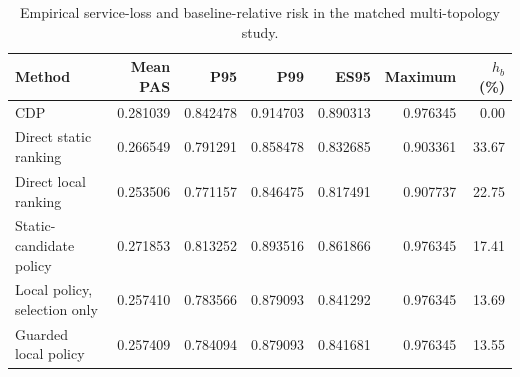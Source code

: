 \begin{table}[!htbp]\centering
\small
\caption{Empirical service-loss and baseline-relative risk in the matched multi-topology study.}\label{tab:reliability_summary}
\begin{tabularx}{\linewidth}{Xrrrrrr}\toprule
Method & Mean PAS & P95 & P99 & ES95 & Maximum & $h_b$ (\%)\\\midrule
CDP & 0.281039 & 0.842478 & 0.914703 & 0.890313 & 0.976345 & 0.00\\
Direct static ranking & 0.266549 & 0.791291 & 0.858478 & 0.832685 & 0.903361 & 33.67\\
Direct local ranking & 0.253506 & 0.771157 & 0.846475 & 0.817491 & 0.907737 & 22.75\\
Static-candidate policy & 0.271853 & 0.813252 & 0.893516 & 0.861866 & 0.976345 & 17.41\\
Local policy, selection only & 0.257410 & 0.783566 & 0.879093 & 0.841292 & 0.976345 & 13.69\\
Guarded local policy & 0.257409 & 0.784094 & 0.879093 & 0.841681 & 0.976345 & 13.55\\
\bottomrule\end{tabularx}
\end{table}
